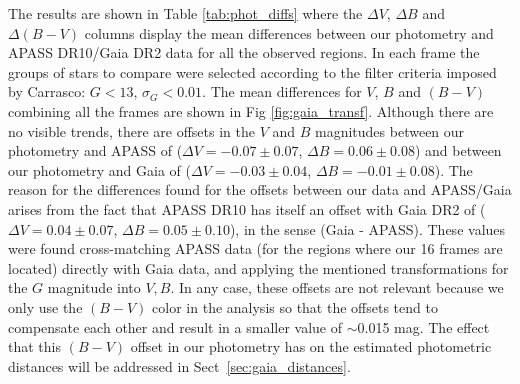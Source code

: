 \documentclass[draft]{aa}
\begin{document}
The results are shown in Table \ref{tab:phot_diffs} where the $\Delta V$,
$\Delta B$ and $\Delta (B-V)$ columns display the mean differences
between our photometry and APASS DR10/Gaia DR2 data for all the observed
regions.
In each frame the groups of stars to compare were selected according
to the filter criteria imposed by Carrasco: $G<13$, $\sigma_{G}<0.01$.
%
The mean differences for $V$, $B$ and $(B-V)$ combining all
the frames are shown in Fig \ref{fig:gaia_transf}. Although there are no
visible trends, there are offsets in the $V$ and $B$ magnitudes between our
photometry and APASS of ($\Delta V=-0.07\pm0.07$, $\Delta B=0.06\pm0.08$) and
between our photometry and Gaia of ($\Delta V=-0.03\pm0.04$,
$\Delta B=-0.01\pm0.08$).
%
The reason for the differences found for the offsets between our data and
APASS/Gaia arises from the fact that APASS DR10 has itself an offset with Gaia
DR2 of ($\Delta V=0.04\pm0.07$, $\Delta B=0.05\pm0.10$), in the sense (Gaia -
APASS).
These values were found cross-matching APASS data (for the regions where
our 16 frames are located) directly with Gaia data, and applying the mentioned
transformations for the $G$ magnitude into $V,B$.
%
In any case, these offsets are not relevant because we only use the $(B-V)$
color in the analysis so that the offsets tend to compensate each other
and result in a smaller value of $\sim$0.015 mag.
The effect that this $(B-V)$ offset in our photometry has on the estimated
photometric distances will be addressed in Sect~\ref{sec:gaia_distances}.\\

\end{document}
